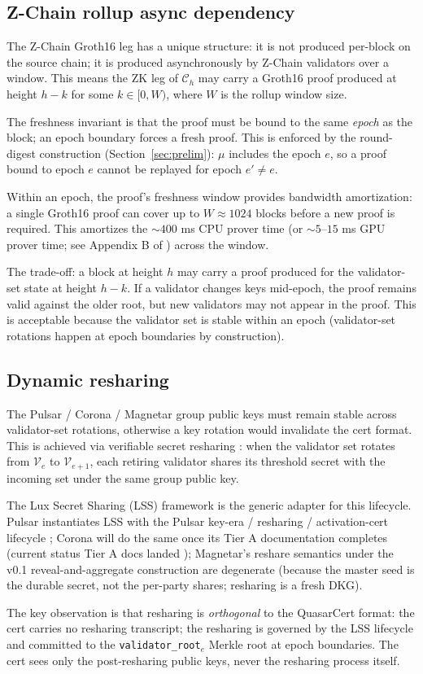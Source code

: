 \subsection{Z-Chain rollup async dependency}

The Z-Chain Groth16 leg has a unique structure: it is not produced
per-block on the source chain; it is produced asynchronously by
Z-Chain validators over a window. This means the $\mathrm{ZK}$ leg
of $\mathcal{C}_h$ may carry a Groth16 proof produced at height
$h - k$ for some $k \in [0, W)$, where $W$ is the rollup window
size.

The freshness invariant is that the proof must be bound to the same
\emph{epoch} as the block; an epoch boundary forces a fresh proof.
This is enforced by the round-digest construction
(Section~\ref{sec:prelim}): $\mu$ includes the epoch $e$, so a
proof bound to epoch $e$ cannot be replayed for epoch $e' \neq e$.

Within an epoch, the proof's freshness window provides bandwidth
amortization: a single Groth16 proof can cover up to $W \approx 1024$
blocks before a new proof is required. This amortizes the
${\sim}400$ ms CPU prover time (or ${\sim}5$--$15$ ms GPU prover time;
see Appendix B of \cite{quasarcertsoundness}) across the window.

The trade-off: a block at height $h$ may carry a proof produced for
the validator-set state at height $h - k$. If a validator changes
keys mid-epoch, the proof remains valid against the older root, but
new validators may not appear in the proof. This is acceptable
because the validator set is stable within an epoch (validator-set
rotations happen at epoch boundaries by construction).

\subsection{Dynamic resharing}

The Pulsar / Corona / Magnetar group public keys must remain stable
across validator-set rotations, otherwise a key rotation would
invalidate the cert format. This is achieved via verifiable
secret resharing \cite{luxlssmpc}: when the validator set rotates
from $\mathcal{V}_e$ to $\mathcal{V}_{e+1}$, each retiring validator
shares its threshold secret with the incoming set under the same
group public key.

The Lux Secret Sharing (LSS) framework \cite{luxlssmpc} is the
generic adapter for this lifecycle. Pulsar instantiates LSS with
the Pulsar key-era / resharing / activation-cert lifecycle
\cite{pulsar}; Corona will do the same once its Tier A
documentation completes (current status Tier A docs landed
\cite{corona}); Magnetar's reshare semantics under the v0.1
reveal-and-aggregate construction are degenerate (because the
master seed is the durable secret, not the per-party shares;
resharing is a fresh DKG).

The key observation is that resharing is \emph{orthogonal} to the
QuasarCert format: the cert carries no resharing transcript; the
resharing is governed by the LSS lifecycle and committed to the
\texttt{validator\_root}$_e$ Merkle root at epoch boundaries. The
cert sees only the post-resharing public keys, never the resharing
process itself.
